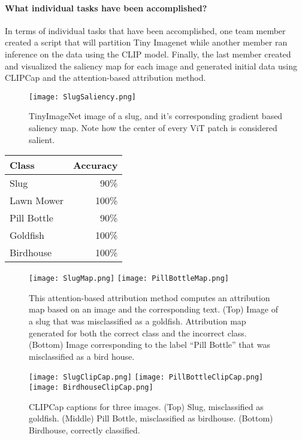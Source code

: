 \paragraph{What individual tasks have been accomplished?}
In terms of individual tasks that have been accomplished, one team member created a script that will partition Tiny Imagenet while another member ran inference on the data using the CLIP model. Finally, the last member created and visualized the saliency map for each image and generated initial data using CLIPCap and the attention-based attribution method. 

\begin{figure}[h]
    \centering
    \texttt{[image: SlugSaliency.png]}
    \caption{TinyImageNet image of a slug, and it's corresponding gradient based saliency map. Note how the center of every ViT patch is considered salient.}
    \label{saliency}
\end{figure}

\begin{table}[h]
    \centering
    \begin{tabular}{lr}
        \toprule
        Class & Accuracy\\
        \midrule
        Slug & 90\% \\
        Lawn Mower & 100\% \\
        Pill Bottle & 90\% \\
        Goldfish & 100\% \\
        Birdhouse & 100\% \\
        \bottomrule
    \end{tabular}
    \label{perfTable}

\end{table}

\begin{figure}[h]
    \centering
    \texttt{[image: SlugMap.png]}
    \texttt{[image: PillBottleMap.png]}
    \caption{This attention-based attribution method computes an attribution map based on an image and the corresponding text. (Top) Image of a slug that was misclassified as a goldfish. Attribution map generated for both the correct class and the incorrect class. (Bottom) Image corresponding to the label ``Pill Bottle'' that was misclassified as a bird house.}
    \label{Map}
\end{figure}

\begin{figure}[h]
    \centering
    \texttt{[image: SlugClipCap.png]}
    \texttt{[image: PillBottleClipCap.png]}
    \texttt{[image: BirdhouseClipCap.png]}
    \caption{CLIPCap captions for three images. (Top) Slug, misclassified as goldfish. (Middle) Pill Bottle, misclassified as birdhouse. (Bottom) Birdhouse, correctly classified.}
    \label{Cap}
\end{figure}

